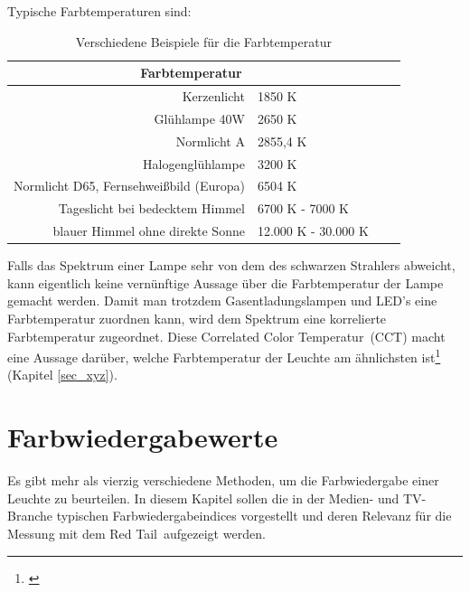 Typische Farbtemperaturen sind:

\begin{table}[htp] 
		\centering
		\begin{tabular}{rlcc}  %
		\toprule
		\multicolumn{2}{c}{\large\sffamily Farbtemperatur}\\ 							
		\midrule
		Kerzenlicht & 1850 K\\
		Glühlampe 40W & 2650 K\\
		Normlicht A & 2855,4 K\\
		Halogenglühlampe & 3200 K\\
		Normlicht D65, Fernsehweißbild (Europa) & 6504 K\\
		Tageslicht bei bedecktem Himmel & 6700 K - 7000 K\\
		blauer Himmel ohne direkte Sonne & 12.000 K - 30.000 K\\
		\bottomrule
		\end{tabular}
		\caption{Verschiedene Beispiele für die Farbtemperatur\protect\footnotemark}	
		\label{t_cct}
	\end{table}


Falls das Spektrum einer Lampe sehr von dem des schwarzen Strahlers abweicht, kann eigentlich keine vernünftige Aussage über die Farbtemperatur der Lampe gemacht werden. Damit man trotzdem Gasentladungslampen und LED's eine Farbtemperatur zuordnen kann, wird dem Spektrum eine korrelierte Farbtemperatur zugeordnet. Diese \glqq Correlated Color Temperatur\grqq\ (CCT) macht eine Aussage darüber, welche Farbtemperatur der Leuchte am ähnlichsten ist\footnote{\cite[91]{mueller}} (Kapitel \ref{sec_xyz}).

\chapter{Farbwiedergabewerte}
Es gibt mehr als vierzig verschiedene Methoden, um die Farbwiedergabe einer Leuchte zu beurteilen. In diesem Kapitel sollen die in der Medien- und TV-Branche typischen Farbwiedergabeindices vorgestellt und deren Relevanz für die Messung mit dem \glqq Red Tail\grqq\  aufgezeigt werden.

